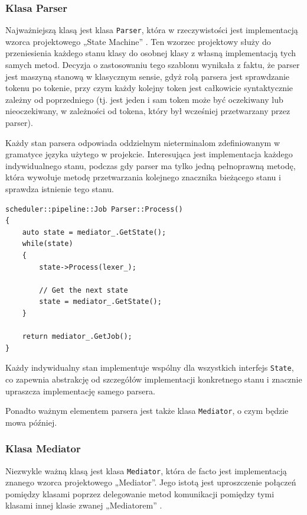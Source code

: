 \subsubsection{Klasa Parser}

Najważniejszą klasą jest klasa \texttt{Parser}, która w rzeczywistości jest implementacją wzorca projektowego „State Machine” \cite{state}. Ten wzorzec projektowy służy do przeniesienia każdego stanu klasy do osobnej klasy z własną implementacją tych samych metod. Decyzja o zastosowaniu tego szablonu wynikała z faktu, że parser jest maszyną stanową w klasycznym sensie, gdyż rolą parsera jest sprawdzanie tokenu po tokenie, przy czym każdy kolejny token jest całkowicie syntaktycznie zależny od poprzedniego (tj. jest jeden i sam token może być oczekiwany lub nieoczekiwany, w zależności od tokena, który był wcześniej przetwarzany przez parser).

Każdy stan parsera odpowiada oddzielnym nieterminalom zdefiniowanym w gramatyce języka użytego w projekcie. Interesująca jest implementacja każdego indywidualnego stanu, podczas gdy parser ma tylko jedną pełnoprawną metodę, która wywołuje metodę przetwarzania kolejnego znacznika bieżącego stanu i sprawdza istnienie tego stanu.


\begin{lstlisting}[label=list:parser,caption=Metoda Parser::Process(),basicstyle=\footnotesize\ttfamily]
scheduler::pipeline::Job Parser::Process()
{
    auto state = mediator_.GetState();
    while(state)
    {
        state->Process(lexer_);
    
        // Get the next state
        state = mediator_.GetState();
    }
    
    return mediator_.GetJob();
}
\end{lstlisting}

Każdy indywidualny stan implementuje wspólny dla wszystkich interfejs \texttt{State}, co zapewnia abstrakcję od szczegółów implementacji konkretnego stanu i znacznie upraszcza implementację samego parsera.

Ponadto ważnym elementem parsera jest także klasa \texttt{Mediator}, o czym będzie mowa później.

\subsubsection{Klasa Mediator}

Niezwykle ważną klasą jest klasa \texttt{Mediator}, która de facto jest implementacją znanego wzorca projektowego „Mediator”. Jego istotą jest uproszczenie połączeń pomiędzy klasami poprzez delegowanie metod komunikacji pomiędzy tymi klasami innej klasie zwanej „Mediatorem” \cite{mediator}.

